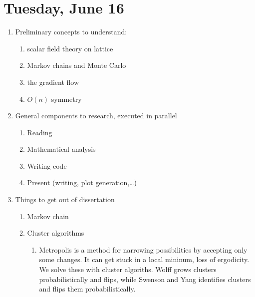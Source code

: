 \documentclass[english]{article}
\begin{document}
\section{Tuesday, June 16}
\begin{enumerate}
        
    \item Preliminary concepts to understand: 
    \begin{enumerate}
        \item scalar field theory on lattice
        \item Markov chains and Monte Carlo
        \item the gradient flow
        \item $O(n)$ symmetry
    \end{enumerate}

    \item General components to research, executed in parallel
    \begin{enumerate}    
        \item Reading
        \item Mathematical analysis
        \item Writing code
        \item Present (writing, plot generation,\dots)
    \end{enumerate}

    \item Things to get out of dissertation \cite{Schaich2006}
    \begin{enumerate}
        \item Markov chain
        \item Cluster algorithms

        \begin{enumerate}
            \item Metropolis is a method for narrowing possibilities by accepting only some changes. It can get stuck in a local mininum, loss of ergodicity. We solve these with cluster algoriths. Wolff grows clusters probabilistically and flips, while Swenson and Yang identifies clusters and flips them probabilistically.


\end{enumerate}
\end{enumerate}
\end{enumerate}
\end{document}
